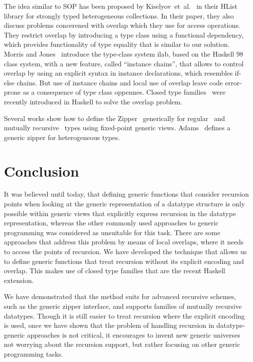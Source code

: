 \documentclass[runningheads]{llncs}
\begin{document}
The idea similar to SOP has been proposed by Kiselyov~et~al.~\cite{Kiselyov2004} in their \textsf{HList} library for strongly typed heterogeneous collections. In their paper, they also discuss problems concerened with overlap which they use for access operations. They restrict overlap by introducing a type class using a functional dependency, which provides functionality of type equality that is similar to our solution. Morris and Jones~\cite{Morris2010} introduce the type-class system \textsf{ilab}, based on the Haskell 98 class system, with a new feature, called ``instance chains'', that allows to control overlap by using an explicit syntax in instance declarations, which resembles if-else chains. But use of instance chains and local use of overlap leave code error-prone as a consequence of type class oppennes. Closed type families~\cite{Eisenberg2014} were recently introduced in Haskell to solve the overlap problem.

Several works show how to define the Zipper~\cite{Huet1997} generically for regular~\cite{HiJeLo2004,McBride2001} and mutually recursive~\cite{MuRec2009} types using fixed-point generic views. Adams~\cite{Adams2010} defines a generic zipper for heterogeneous types.



\section{Conclusion}
\label{sec:conclusion}

It was believed until today, that defining generic functions that consider recursion points when looking at the generic representation of a datatype structure is only possible within generic views that explicitly express recursion in the datatype representation, whereas the other commonly used approaches to generic programming was considered as unsuitable for this task. There are some approaches that address this problem by means of local overlaps, where it needs to access the points of recursion. We have developed the technique that allows us to define generic functions that treat recursion without its explicit encoding and overlap. This makes use of closed type families that are the recent Haskell extension.

We have demonstrated that the method suits for advanced recursive schemes, such as the generic zipper interface, and supports families of mutually recursive datatypes. Though it is still easier to treat recursion where the explicit encoding is used, once we have shown that the problem of handling recursion in datatype-generic approaches is not critical, it encourages to invent new generic universes not worrying about the recursion support, but rather focusing on other generic programming tasks.


%
%
%


%
\end{document}
